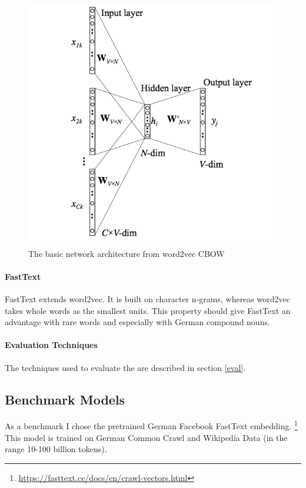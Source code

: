 \documentclass[10pt,a4paper]{article}
\begin{document}
\begin{figure}
	\begin{center}
		\includegraphics[scale=0.4]{./Pictures/w2v_arch.png}
		
		\caption{The basic network architecture from word2vec CBOW}
		\label{w2v_arch}
	\end{center}
\end{figure}

    \paragraph{FastText} FastText extends word2vec. It is built on character n-grams, whereas word2vec takes whole words as the smallest units. This property should give FastText an advantage with rare words and especially with German compound nouns.
    
    \paragraph{Evaluation Techniques}
    The techniques used to evaluate the are described in section \ref{eval}.
    
    
    \subsection{Benchmark Models}
    As a benchmark I chose the pretrained German Facebook FastText embedding. \footnote{\url{https://fasttext.cc/docs/en/crawl-vectors.html}} This model is trained on German Common Crawl and Wikipedia Data (in the range 10-100 billion tokens).
			
\end{document}
